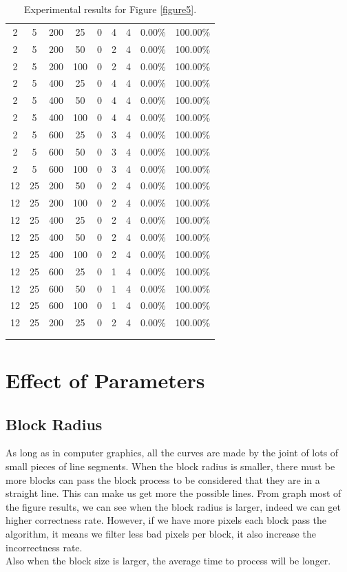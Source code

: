 {\begin{longtable}{| c | c | c | c | c | c | c | c | c |}
2&5&200&25&0&4&4&0.00\%&100.00\%\\
2&5&200&50&0&2&4&0.00\%&100.00\%\\
2&5&200&100&0&2&4&0.00\%&100.00\%\\
2&5&400&25&0&4&4&0.00\%&100.00\%\\
2&5&400&50&0&4&4&0.00\%&100.00\%\\
2&5&400&100&0&4&4&0.00\%&100.00\%\\
2&5&600&25&0&3&4&0.00\%&100.00\%\\
2&5&600&50&0&3&4&0.00\%&100.00\%\\
2&5&600&100&0&3&4&0.00\%&100.00\%\\
12&25&200&50&0&2&4&0.00\%&100.00\%\\
12&25&200&100&0&2&4&0.00\%&100.00\%\\
12&25&400&25&0&2&4&0.00\%&100.00\%\\
12&25&400&50&0&2&4&0.00\%&100.00\%\\
12&25&400&100&0&2&4&0.00\%&100.00\%\\
12&25&600&25&0&1&4&0.00\%&100.00\%\\
12&25&600&50&0&1&4&0.00\%&100.00\%\\
12&25&600&100&0&1&4&0.00\%&100.00\%\\
12&25&200&25&0&2&4&0.00\%&100.00\%\\ \\\hline
\caption{Experimental results for Figure \ref{figure5}.}
\label{table5}
\end{longtable}
}
\endgroup

\section{Effect of Parameters}
\subsection{Block Radius}
As long as in computer graphics, all the curves are made by the joint of lots of small pieces of line segments. When the block radius is smaller, there must be more blocks can pass the block process to be considered that they are in a straight line. This can make us get more the possible lines. From graph most of the figure results, we can see when the block radius is larger, indeed we can get higher correctness rate. However, if we have more pixels each block pass the algorithm, it means we filter less bad pixels per block, it also increase the incorrectness rate.\\
Also when the block size is larger, the average time to process will be longer.

